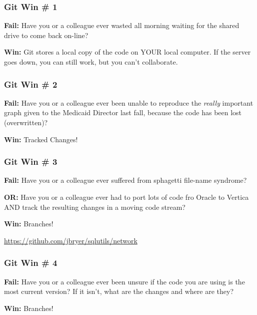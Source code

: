 \documentclass{beamer}
\begin{document}
\begin{frame}
  \frametitle{Git Win \# 1} 
 
  \textbf{Fail:} Have you or a colleague ever wasted all morning
  waiting for the shared drive to come back on-line?
 
  \bigskip 

  \textbf{Win:} Git stores a local copy of the code on YOUR local
  computer. If the server goes down, you can still work, but you can't
  collaborate.
  
\end{frame}
 
\begin{frame}
  \frametitle{Git Win \# 2} 

  \textbf{Fail:} Have you or a colleague ever been unable to reproduce
  the \emph{really} important graph given to the Medicaid Director
  last fall, because the code has been lost (overwritten)?

  \bigskip 

  \textbf{Win:} Tracked Changes!

\end{frame}
 
\begin{frame}
  \frametitle{Git Win \# 3}

  \textbf{Fail:} Have you or a colleague ever suffered from sphagetti
  file-name syndrome?

  \textbf{OR:} Have you or a colleague ever had to port lots of code
  fro Oracle to Vertica AND track the resulting changes in a moving
  code stream?

  \bigskip 

  \textbf{Win:} Branches!

  \url{https://github.com/jbryer/sqlutils/network}

\end{frame}
 
\begin{frame}
  \frametitle{Git Win \# 4} 

  \textbf{Fail:} Have you or a colleague ever been unsure if the code
  you are using is the most current version? If it isn't, what are the
  changes and where are they?
  
  \bigskip 

  \textbf{Win:} Branches!

\end{frame}
 
\end{document}
